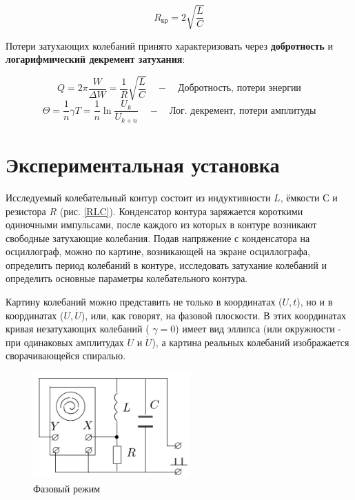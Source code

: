 \documentclass[12pt]{kiarticle}
\begin{document}
\begin{equation}\label{}
R_{кр} = 2\sqrt{\dfrac{L}{C}}
\end{equation}

Потери затухающих колебаний принято характеризовать через \textbf{добротность} и \textbf{логарифмический декремент затухания}: 

\begin{equation}\label{Q}
Q = 2\pi \dfrac{W}{\Delta W} = \dfrac{1}{R} \sqrt{\dfrac{L}{C}} \quad - \quad \text{Добротность, потери энергии}
\end{equation}
\begin{equation}\label{theta}
\Theta = \dfrac{1}{n} \gamma T = \dfrac{1}{n} \ln \dfrac{U_k}{U_{k+n}}  \quad - \quad \text{Лог. декремент, потери амплитуды}
\end{equation}

\section{Экспериментальная установка}
Исследуемый колебательный контур состоит из индуктивности $ L $,
ёмкости $ С $ и резистора $ R $ (рис. \ref{RLC}). Конденсатор контура заряжается
короткими одиночными импульсами, после каждого из которых в контуре
возникают свободные затухающие колебания. Подав напряжение
с конденсатора на осциллограф, можно по картине, возникающей на
экране осциллографа, определить период колебаний в контуре, исследовать
затухание колебаний и определить основные параметры колебательного
контура.

Картину колебаний можно представить не только в координатах ($ U, t $), но и в координатах ($ U, \dot{U} $), или, как говорят, на фазовой
плоскости. В этих координатах кривая незатухающих колебаний ( $ \gamma = 0 $)
имеет вид эллипса (или окружности - при одинаковых амплитудах $ U $
и $ \dot{U} $), а картина реальных колебаний изображается сворачивающейся
спиралью. 


\begin{figure} 
	\includegraphics[width=6cm]{Fase}
	\caption{Фазовый режим}
	\label{Fase}
\end{figure}
\end{document}
